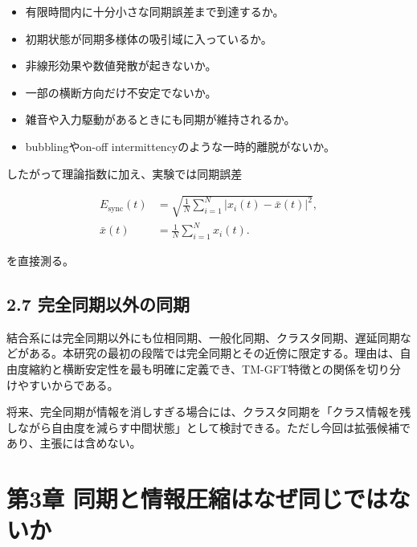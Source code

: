 \documentclass[11pt,a4paper]{ltjsarticle}
\begin{document}
\begin{itemize}

\item 有限時間内に十分小さな同期誤差まで到達するか。

\item 初期状態が同期多様体の吸引域に入っているか。

\item 非線形効果や数値発散が起きないか。

\item 一部の横断方向だけ不安定でないか。

\item 雑音や入力駆動があるときにも同期が維持されるか。

\item bubblingやon-off intermittencyのような一時的離脱がないか。

\end{itemize}

したがって理論指数に加え、実験では同期誤差\par

\[
\begin{aligned}
E_{\mathrm{sync}}(t)
&=\sqrt{\frac{1}{N}\sum_{i=1}^{N}\left|x_i(t)-\bar{x}(t)\right|^2},\\
\bar{x}(t)&=\frac{1}{N}\sum_{i=1}^{N}x_i(t).
\end{aligned}
\]

を直接測る。\par

\subsection*{\textcolor{researchblue}{2.7 完全同期以外の同期}}

結合系には完全同期以外にも位相同期、一般化同期、クラスタ同期、遅延同期などがある。本研究の最初の段階では完全同期とその近傍に限定する。理由は、自由度縮約と横断安定性を最も明確に定義でき、TM-GFT特徴との関係を切り分けやすいからである。\par

将来、完全同期が情報を消しすぎる場合には、クラスタ同期を「クラス情報を残しながら自由度を減らす中間状態」として検討できる。ただし今回は拡張候補であり、主張には含めない。\par

\goodbreak

\section*{\textcolor{researchink}{第3章 同期と情報圧縮はなぜ同じではないか}}
\end{document}
